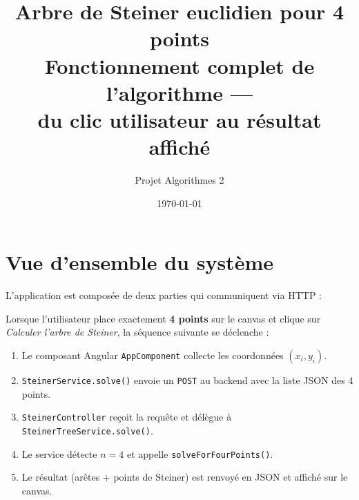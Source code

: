 \documentclass[12pt, a4paper]{article}
\title{
    \textbf{Arbre de Steiner euclidien pour 4 points}\\[0.4em]
    \large Fonctionnement complet de l'algorithme —\\
    du clic utilisateur au résultat affiché
}
\author{Projet Algorithmes 2}
\date{\today}
\begin{document}
\maketitle
\tableofcontents
\newpage

\section{Vue d'ensemble du système}

L'application est composée de deux parties qui communiquent via HTTP :

\begin{center}
\end{center}

\bigskip

Lorsque l'utilisateur place exactement \textbf{4 points} sur le canvas et clique sur
\emph{Calculer l'arbre de Steiner}, la séquence suivante se déclenche :

\begin{enumerate}
    \item Le composant Angular \texttt{AppComponent} collecte les coordonnées $(x_i, y_i)$.
    \item \texttt{SteinerService.solve()} envoie un \texttt{POST} au backend avec la liste JSON des 4 points.
    \item \texttt{SteinerController} reçoit la requête et délègue à \texttt{SteinerTreeService.solve()}.
    \item Le service détecte $n = 4$ et appelle \texttt{solveForFourPoints()}.
    \item Le résultat (arêtes + points de Steiner) est renvoyé en JSON et affiché sur le canvas.
\end{enumerate}
\end{document}
